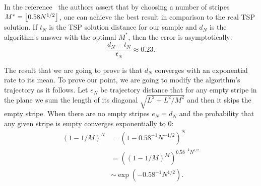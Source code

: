 \begin{figure}[ht]\label{TSP:pic0}
    \centering
\end{figure}

In the reference~\cite{gzyl1990physicist} the authors assert that by choosing a number of stripes $M^* = \left\lfloor0.58 N^{1/2}\right\rfloor$, one can achieve the best result in comparison to the real TSP solution. If $t_N$ is the TSP solution distance for our sample and $d_N$ is the algorithm's answer with the optimal $M^*$, then the error is asymptotically:
\[  \frac{d_N-t_N}{t_N} \approx 0.23.\] 

The result that we are going to prove is that $d_N$ converges with an exponential rate to its mean. To prove our point, we are going to modify the algorithm's trajectory as it follows. Let $e_N$ be trajectory distance that for any empty stripe in the plane we sum the length of its diagonal $\sqrt{L^2+ L^2/M^2}$ and then it skips the empty stripe. When there are no empty stripes $e_N = d_N$ and the probability that any given stripe is empty converges exponentially to 0:
\[ \begin{array}{rl}
    {(1- 1/M)}^N & = {(1- 0.58^{-1} N^{-1/2})}^N\\[1em]
    & = {\left({(1- 1/M)}^{M}\right)}^{0.58^{-1} N^{1/2}}\\[1em]
    &  \sim \exp(-0.58^{-1} N^{1/2}).
\end{array} \] 



